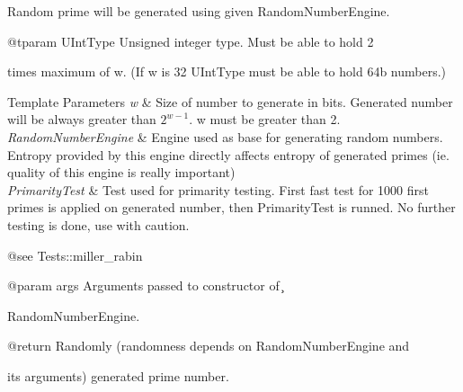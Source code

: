 Random prime will be generated using given {\ttfamily Random\+Number\+Engine}. \begin{DoxyVerb}        @tparam UIntType Unsigned integer type. Must be able to hold 2
\end{DoxyVerb}
 times maximum of {\ttfamily w}. (If {\ttfamily w} is 32 {\ttfamily U\+Int\+Type} must be able to hold 64b numbers.) 
\begin{DoxyTemplParams}{Template Parameters}
{\em w} & Size of number to generate in bits. Generated number will be always greater than $ 2^{w-1} $. {\ttfamily w} must be greater than 2. \\
\hline
{\em Random\+Number\+Engine} & Engine used as base for generating random numbers. Entropy provided by this engine directly affects entropy of generated primes (ie. quality of this engine is really important) \\
\hline
{\em Primarity\+Test} & Test used for primarity testing. First fast test for 1000 first primes is applied on generated number, then {\ttfamily Primarity\+Test} is runned. No further testing is done, use with caution. \begin{DoxyVerb}        @see Tests::miller_rabin

        @param args Arguments passed to constructor of \c
\end{DoxyVerb}
 Random\+Number\+Engine. \begin{DoxyVerb}        @return Randomly (randomness depends on RandomNumberEngine and
\end{DoxyVerb}
 its arguments) generated prime number. \\
\hline
\end{DoxyTemplParams}


